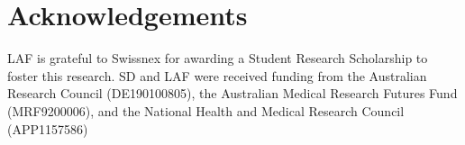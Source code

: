 \documentclass{article}
\begin{document}
\section*{Acknowledgements}
LAF is grateful to Swissnex for awarding a Student Research Scholarship to foster this research. SD and LAF were received funding from the Australian Research Council (DE190100805), the Australian Medical Research Futures Fund (MRF9200006), and the National Health and Medical Research Council (APP1157586)
%
\end{document}
